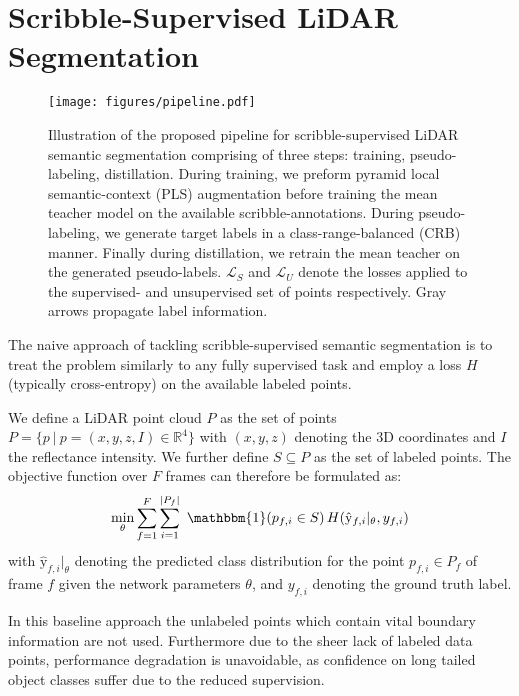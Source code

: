 \documentclass[10pt,twocolumn,letterpaper]{article}
\begin{document}
\section{Scribble-Supervised LiDAR Segmentation}

\begin{figure*}
    \centering
    \texttt{[image: figures/pipeline.pdf]}
    \caption{Illustration of the proposed pipeline for scribble-supervised LiDAR semantic segmentation comprising of three steps: training, pseudo-labeling, distillation. During training, we preform pyramid local semantic-context (PLS) augmentation before training the mean teacher model on the available scribble-annotations. During pseudo-labeling, we generate target labels in a class-range-balanced (CRB) manner. Finally during distillation, we retrain the mean teacher on the generated pseudo-labels. $\mathcal{L}_S$ and $\mathcal{L}_U$ denote the losses applied to the supervised- and unsupervised set of points respectively. Gray arrows propagate label information.}
    \label{fig:pipeline}
\end{figure*}

The naive approach of tackling scribble-supervised semantic segmentation is to treat the problem similarly to any fully supervised task and employ a loss $H$ (typically cross-entropy) on the available labeled points. 

We define a LiDAR point cloud $P$ as the set of points ${P = \{p \ | \ p = (x,y,z,I)  \in \mathbb{R}^4\}}$ with $(x,y,z)$ denoting the 3D coordinates and $I$ the reflectance intensity. We further define $S \subseteq P$ as the set of labeled points. The objective function over $F$ frames can therefore be formulated as:
\begin{equation} \label{eq:partial_h}
    \min_{\theta} \sum_{f=1}^{F}\sum_{i=1}^{|P_f|} \
    \mathbbm{1}(p_{f,i}\in S) \,  H(\hat{\mathrm{y}}_{f,i}|_\theta, y_{f,i}) \\
\end{equation}
with $\hat{\mathrm{y}}_{f,i}|_\theta$ denoting the predicted class distribution for the point $p_{f,i} \in P_f$ of frame $f$ given the network parameters $\theta$, and $y_{f,i}$ denoting the ground truth label.

In this baseline approach the unlabeled points which contain vital boundary information are not used. Furthermore due to the sheer lack of labeled data points, performance degradation is unavoidable, as confidence on long tailed object classes suffer due to the reduced supervision.
\end{document}
